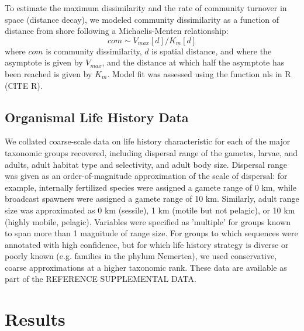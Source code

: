 \documentclass[11pt,letterpaper]{article} %
\begin{document}
To estimate the maximum dissimilarity and the rate of community turnover in space (distance decay), we modeled community dissimilarity as a function of distance from shore following a Michaelis-Menten relationship:
\begin{equation}\label{MichaelisMenten}
	com \sim V_{max}[d]/K_{m}[d]
\end{equation}
where $com$ is community dissimilarity, $d$ is spatial distance, and where the asymptote is given by $V_{max}$, and the distance at which half the asymptote has been reached is given by $K_{m}$.
Model fit was assessed using the function nls in R (CITE R).


\subsection*{Organismal Life History Data}
We collated coarse-scale data on life history characteristic for each of the major taxonomic groups recovered, including dispersal range of the gametes, larvae, and adults, adult habitat type and selectivity, and adult body size.
Dispersal range was given as an order-of-magnitude approximation of the scale of dispersal: for example, internally fertilized species were assigned a gamete range of 0 km, while broadcast spawners were assigned a gamete range of 10 km.
Similarly, adult range size was approximated as 0 km (sessile), 1 km (motile but not pelagic), or 10 km (highly mobile, pelagic).
Variables were specified as 'multiple' for groups known to span more than 1 magnitude of range size.
For groups to which sequences were annotated with high confidence, but for which life history strategy is diverse or poorly known (e.g. families in the phylum Nemertea), we used conservative, coarse approximations at a higher taxonomic rank.
These data are available as part of the REFERENCE SUPPLEMENTAL DATA.

\section*{Results}
\end{document}
